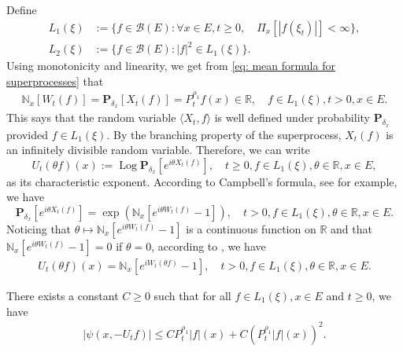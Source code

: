 \documentclass[EJP]{ejpecp} %
\begin{document}
Define
\begin{align}
  L_1(\xi)
  &:= \{f\in \mathcal B(E): \forall x\in E, t\geq 0, \quad \Pi_x[|f(\xi_t)|]< \infty\}, \\
  L_2(\xi)
  &:= \{f \in \mathcal B(E): |f|^2 \in L_1(\xi)\}.
\end{align}
Using monotonicity and linearity, we get from \eqref{eq: mean formula for superprocesses}  that
\begin{align}
  \mathbb N_x[W_t(f)]
  = \mathbf P_{\delta_x}[X_t(f)]
  = P^{\rho_1}_t f(x) \in \mathbb R,
  \quad f\in L_1(\xi), t > 0,x\in E.
\end{align}
This says that the random variable $\langle X_t, f\rangle$ is well defined under probability $\mathbf P_{\delta_x}$ provided $f\in L_1(\xi)$.
By the branching property of the superprocess, $X_t(f)$ is an infinitely divisible random variable.
Therefore, we can write
\[
  U_t(\theta f)(x)
  := \operatorname{Log} \mathbf P_{\delta_x}[e^{i \theta X_t( f)}],
  \quad t\geq 0, f\in L_1(\xi), \theta \in \mathbb R, x\in E,
\]
as its characteristic exponent.
According to Campbell's formula, see \cite[Theorem 2.7]{Kyprianou2014Fluctuations} for example, we have
\[
  \mathbf P_{\delta_x} [e^{i\theta X_t(f)}]
  = \exp(\mathbb N_x[ e^{i\theta W_t(f)} - 1]),
  \quad t>0, f\in L_1(\xi), \theta \in \mathbb R, x\in E.
\]
Noticing that $\theta \mapsto \mathbb N_x[e^{i\theta W_t(f)} - 1]$ is a continuous function on $\mathbb R$ and that $\mathbb N_x[e^{i\theta W_t(f)} - 1] = 0$ if $\theta = 0$, according to \cite[Lemma 7.6]{Sato2013Levy}, we have
\begin{align}
  \label{eq: N and characteristic exponent}
  U_t(\theta f)(x)
  = \mathbb N_x[e^{i W_t(\theta f)} - 1],
  \quad t>0, f\in L_1(\xi), \theta \in \mathbb R, x\in E.
\end{align}

\begin{lemma}
  There exists a constant $C\geq 0$ such that
  for all $f \in L_1(\xi),x\in E$ and $t\geq 0$, we have
  \begin{align}
    \label{eq: upper bound of psi(v)}
    |\psi (x,-U_tf)|
    \leq C P^{\rho_1}_t |f|(x) + C (P^{\rho_1}_t |f| (x))^2.
  \end{align}
\end{lemma}
\end{document}
